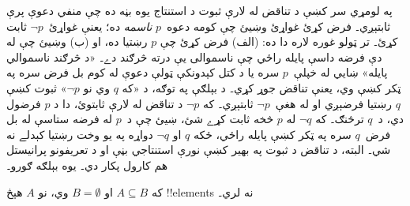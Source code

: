 \documentclass[../../../include/open-logic-section]{subfiles}
\begin{document}


په لومړي سر کښې د تناقض له لارې ثبوت د استنتاج يوه بڼه
ده چې منفي دعوې پرې ثابتېږي۔ فرض کړئ غواړئ وښيئ چې کومه
دعوه~$p$ \emph{ناسمه} ده؛ يعنې غواړئ~$\lnot p$ ثابت کړئ۔
تر ټولو غوره لاره دا ده: (الف) فرض کړئ چې $p$ رښتيا ده،
او (ب) وښيئ چې له دې فرضه داسې پايله راځي چې ناسموالی
يې درته څرګند دے۔ «د څرګند ناسموالي پايله» ښايي له
خپلې~$p$ سره يا د کتل کېدونکې ټولې دعوې له کوم بل
فرض سره په ټکر کښې وي، يعنې تناقض جوړ کړي۔ د بېلګې
په توګه، د «که $q$ وي نو $\lnot p$» ثبوت کښې $q$
رښتيا فرضېږي او له هغې~$\lnot
p$ ثابتېږي۔ که $\lnot p$ د تناقض له لارې ثابتوئ،
دا د $p$ فرضول دي، د~$q$ ترڅنګ۔ که $\lnot q$
له $p$ څخه ثابت کړے شئ، ښيئ چې د~$p$ له فرضه
ستاسې له بل فرض~$q$ سره په ټکر کښې پايله راځي، ځکه
$q$ او $\lnot q$ دواړه په يو وخت رښتيا کېدلے نه شي۔
البته، د تناقض د ثبوت په بهير کښې نورې استنتاجي بڼې او
د تعريفونو پرانيستل هم کارول پکار دي۔ يوه بېلګه ګورو۔

\begin{prop}
  که $A \subseteq B$ او $B = \emptyset$ وي، نو $A$ هېڅ
  !!{element}s نه لري۔
\end{prop}
\end{document}
